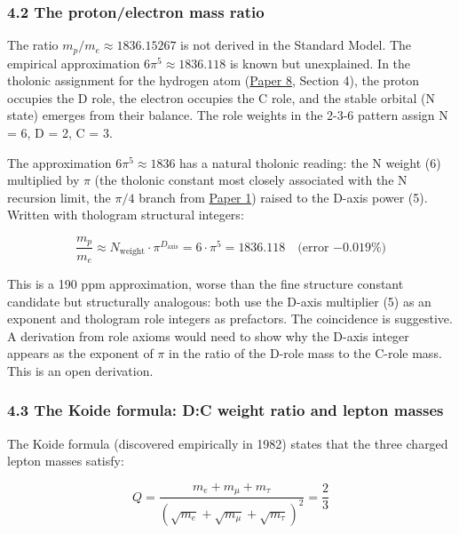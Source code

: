 \documentclass[
  11pt,
  letterpaper,
]{article}
\begin{document}
\subsubsection{4.2 The proton/electron mass
ratio}\label{the-protonelectron-mass-ratio}

The ratio \(m_p / m_e \approx 1836.15267\) is not derived in the
Standard Model. The empirical approximation \(6\pi^5 \approx 1836.118\)
is known but unexplained. In the tholonic assignment for the hydrogen
atom
(\href{https://github.com/baardev/truevalue/blob/main/docnav/Research/papers/8_atom-as-tholon-measurable-phenomena/8_atom-as-tholon-measurable-phenomena.pdf}{Paper
8}, Section 4), the proton occupies the D role, the electron occupies
the C role, and the stable orbital (N state) emerges from their balance.
The role weights in the 2-3-6 pattern assign N = 6, D = 2, C = 3.

The approximation \(6\pi^5 \approx 1836\) has a natural tholonic
reading: the N weight (6) multiplied by \(\pi\) (the tholonic constant
most closely associated with the N recursion limit, the \(\pi/4\) branch
from
\href{https://github.com/baardev/truevalue/blob/main/docnav/Research/papers/1_recursive-tholonic-five-constants/1_recursive-tholonic-five-constants.pdf}{Paper
1}) raised to the D-axis power (5). Written with thologram structural
integers:

\[\frac{m_p}{m_e} \approx N_{\text{weight}} \cdot \pi^{D_{\text{axis}}} = 6 \cdot \pi^5 = 1836.118 \quad \text{(error } {-0.019\%)}\]

This is a 190 ppm approximation, worse than the fine structure constant
candidate but structurally analogous: both use the D-axis multiplier (5)
as an exponent and thologram role integers as prefactors. The
coincidence is suggestive. A derivation from role axioms would need to
show why the D-axis integer appears as the exponent of \(\pi\) in the
ratio of the D-role mass to the C-role mass. This is an open derivation.

\subsubsection{4.3 The Koide formula: D:C weight ratio and lepton
masses}\label{the-koide-formula-dc-weight-ratio-and-lepton-masses}

The Koide formula (discovered empirically in 1982) states that the three
charged lepton masses satisfy:

\[Q = \frac{m_e + m_\mu + m_\tau}{(\sqrt{m_e} + \sqrt{m_\mu} + \sqrt{m_\tau})^2} = \frac{2}{3}\]
\end{document}
